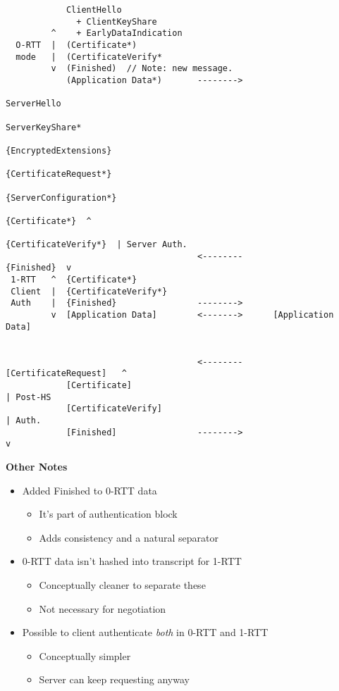 \documentclass[helvetica]{seminar}
\newcommand{\heading}[1]{%
  \begin{center} 
    \large\bf 
    #1 
  \end{center} 
  \vspace{.4 in}}
\begin{document}
\begin{slide}
\begin{scriptsize}
\begin{verbatim}
            ClientHello
              + ClientKeyShare
         ^    + EarlyDataIndication
  O-RTT  |  (Certificate*)
  mode   |  (CertificateVerify*
         v  (Finished)  // Note: new message.
            (Application Data*)       -------->
                                                            ServerHello
                                                        ServerKeyShare*
                                                  {EncryptedExtensions}
                                                  {CertificateRequest*}
                                                 {ServerConfiguration*} 
                                                         {Certificate*}  ^
                                                   {CertificateVerify*}  | Server Auth.
                                      <--------              {Finished}  v
 1-RTT   ^  {Certificate*}
 Client  |  {CertificateVerify*}
 Auth    |  {Finished}                -------->
         v  [Application Data]        <------->      [Application Data]

                         
                                      <--------    [CertificateRequest]   ^
            [Certificate]                                                 | Post-HS
            [CertificateVerify]                                           | Auth.
            [Finished]                -------->                           v
\end{verbatim}
\end{scriptsize}
\end{slide}

\begin{slide}
\heading{Other Notes}

\begin{itemize}
\item Added Finished to 0-RTT data
  \begin{itemize}
  \item It's part of authentication block
  \item Adds consistency and a natural separator
  \end{itemize}

\item 0-RTT data isn't hashed into transcript for 1-RTT
  \begin{itemize}
  \item Conceptually cleaner to separate these
  \item Not necessary for negotiation
  \end{itemize}

\item Possible to client authenticate \emph{both} in 0-RTT and 1-RTT
  \begin{itemize}
  \item Conceptually simpler
  \item Server can keep requesting anyway
  \end{itemize}
\end{itemize}
\end{slide}
\end{document}
